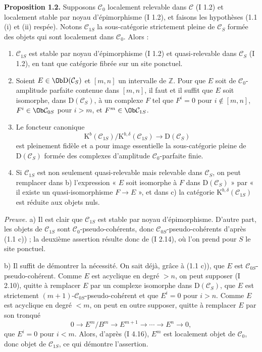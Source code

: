 \documentclass[11pt]{article}
\begin{document}
\textbf{Proposition 1.2.} Supposons $\mathcal C_0$ localement relevable dans $\mathcal C$ (I 1.2) et localement stable par noyau d'épimorphisme (I 1.2), et faisons les hypothèses (1.1 (i) et (ii) respée). Notons $\mathcal C_{1S}$ la sous-catégorie strictement pleine de $\mathcal C_S$ formée des objets qui sont localement dans $\mathcal C_0$. Alors :
\begin{enumerate}[label=\alph*)]
\item $\mathcal C_{1S}$ est stable par noyau d'épimorphisme (I 1.2) et quasi-relevable dans $\mathcal C_S$ (I 1.2), en tant que catégorie fibrée sur un site ponctuel.
\item Soient $E\in\Ob\mathrm D(\mathcal C_S)$ et $[m,n]$ un intervalle de $\mathbb Z$. Pour que $E$ soit de $\mathcal C_0$-amplitude parfaite contenue dans $[m,n]$, il faut et il suffit que $E$ soit isomorphe, dans $\mathrm D(\mathcal C_S)$, à un complexe $F$ tel que $F^i=0$ pour $i\notin[m,n]$, $F^i\in\Ob\mathcal C_{0S}$ pour $i>m$, et $F^m\in\Ob\mathcal C_{1S}$.
\item Le foncteur canonique
\[
\mathrm K^b(\mathcal C_{1S})/\mathrm K^{b,\delta}(\mathcal C_{1S})
\longrightarrow \mathrm D(\mathcal C_S)
\]
est pleinement fidèle et a pour image essentielle la sous-catégorie pleine de $\mathrm D(\mathcal C_S)$ formée des complexes d'amplitude $\mathcal C_0$-parfaite finie.
\item Si $\mathcal C_{1S}$ est non seulement quasi-relevable mais relevable dans $\mathcal C_S$, on peut remplacer dans b) l'expression « $E$ soit isomorphe à $F$ dans $\mathrm D(\mathcal C_S)$ » par « il existe un quasi-isomorphisme $F\to E$ », et dans c) la catégorie $\mathrm K^{b,\delta}(\mathcal C_{1S})$ est réduite aux objets nuls.
\end{enumerate}

\emph{Preuve.} a) Il est clair que $\mathcal C_{1S}$ est stable par noyau d'épimorphisme. D'autre part, les objets de $\mathcal C_{1S}$ sont $\mathcal C_0$-pseudo-cohérents, donc $\mathcal C_{0S}$-pseudo-cohérents d'après (1.1 c)) ; la deuxième assertion résulte donc de (I 2.14), où l'on prend pour $S$ le site ponctuel.

b) Il suffit de démontrer la nécessité. On sait déjà, grâce à (1.1 c)), que $E$ est $\mathcal C_{0S}$-pseudo-cohérent. Comme $E$ est acyclique en degré $>n$, on peut supposer (I 2.10), quitte à remplacer $E$ par un complexe isomorphe dans $\mathrm D(\mathcal C_S)$, que $E$ est strictement $(m+1)$-$\mathcal C_{0S}$-pseudo-cohérent et que $E^i=0$ pour $i>n$. Comme $E$ est acyclique en degré $<m$, on peut en outre supposer, quitte à remplacer $E$ par son tronqué
\[
0\longrightarrow E^m/B^m\longrightarrow E^{m+1}\longrightarrow\cdots\longrightarrow E^n\longrightarrow0,
\]
que $E^i=0$ pour $i<m$. Alors, d'après (I 4.16), $E^m$ est localement objet de $\mathcal C_0$, donc objet de $\mathcal C_{1S}$, ce qui démontre l'assertion.
\end{document}
